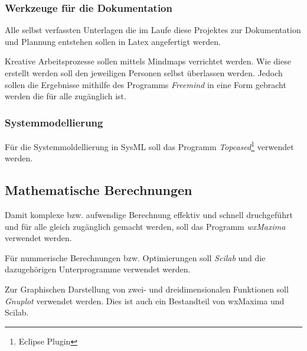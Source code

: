 	\subsubsection{Werkzeuge für die Dokumentation}
		Alle selbst verfassten Unterlagen die im Laufe diese Projektes zur Dokumentation und Plannung 
		entstehen sollen in Latex angefertigt werden. 
		
		Kreative Arbeitsprozesse sollen mittels Mindmaps verrichtet werden. Wie diese erstellt werden soll den
		jeweiligen Personen selbst überlassen werden. Jedoch sollen die Ergebnisse mithilfe des Programms 
		\textit{Freemind} in eine Form gebracht werden die für alle zugänglich ist.
		
	\subsubsection{Systemmodellierung}
		Für die Systemmoldellierung in SysML soll das Programm \textit{Topcased}\footnote{Eclipse Plugin}
		verwendet werden.
		
	\subsection{Mathematische Berechnungen}
		Damit komplexe bzw. aufwendige Berechnung effektiv und schnell druchgeführt und für alle gleich zugänglich
		gemacht werden, soll das Programm \textit{wxMaxima} verwendet werden.
		
		Für nummerische Berechnungen bzw. Optimierungen soll \textit{Scilab} und die dazugehörigen Unterprogramme
		verwendet werden.
		
		Zur Graphischen Darstellung von zwei- und dreidimensionalen Funktionen soll \textit{Gnuplot} verwendet werden.
		Dies ist auch ein Bestandteil von wxMaxima und Scilab.
	
	